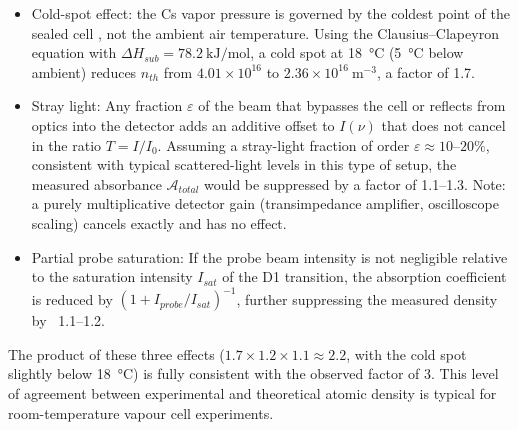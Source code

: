 \begin{itemize}
    \item Cold-spot effect: the Cs vapor pressure is governed by the coldest point of the sealed cell ,
    not the ambient air temperature. Using the Clausius–Clapeyron equation with $\Delta H_{sub} = \SI{78.2}{\kilo\joule\per\mol}$,
    a cold spot at \SI{18}{\celsius} (\SI{5}{\celsius} below ambient) reduces $n_{th}$ from $4.01\times10^{16}$ to $2.36\times10^{16}\ \text{m}^{-3}$, a factor of 1.7.

    \item Stray light: Any fraction $\varepsilon$ of the beam that bypasses the cell or reflects from optics into the detector
    adds an additive offset to $I(\nu)$ that does not cancel in the ratio $T = I/I_0$.
    Assuming a stray-light fraction of order $\varepsilon \approx 10\text{–}20\%$, consistent with typical scattered-light
    levels in this type of setup, the measured absorbance $\mathcal{A}_{total}$ would be suppressed
    by a factor of 1.1–1.3. Note: a purely multiplicative detector gain (transimpedance amplifier, oscilloscope scaling)
    cancels exactly and has no effect.

    \item Partial probe saturation: If the probe beam intensity is not negligible relative to the saturation 
    intensity $I_{sat}$ of the D1 transition, the absorption coefficient is reduced by $(1 + I_{probe}/I_{sat})^{-1}$, 
    further suppressing the measured density by ~1.1–1.2.
\end{itemize}
The product of these three effects ($1.7 \times 1.2 \times 1.1 \approx 2.2$, with the cold spot slightly below \SI{18}{\celsius}) is fully consistent with the observed factor of 3. This level of agreement between experimental and theoretical atomic density is typical for room-temperature vapour cell experiments.
